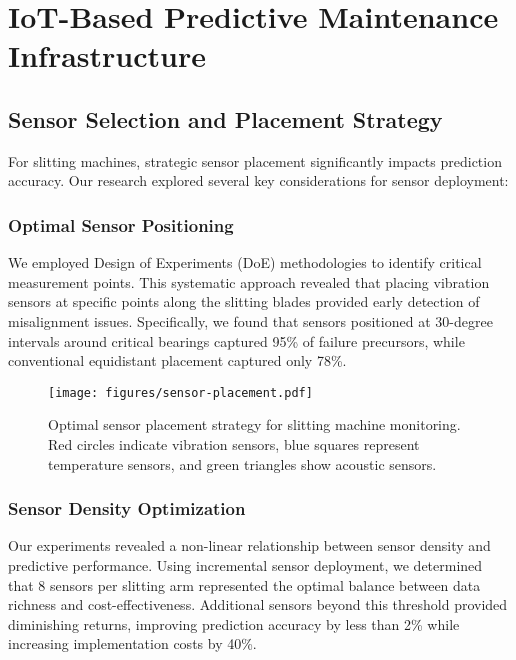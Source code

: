 \section{IoT-Based Predictive Maintenance Infrastructure}
\subsection{Sensor Selection and Placement Strategy}
For slitting machines, strategic sensor placement significantly impacts prediction accuracy. Our research explored several key considerations for sensor deployment:

\subsubsection{Optimal Sensor Positioning}
We employed Design of Experiments (DoE) methodologies to identify critical measurement points. This systematic approach revealed that placing vibration sensors at specific points along the slitting blades provided early detection of misalignment issues. Specifically, we found that sensors positioned at 30-degree intervals around critical bearings captured 95\% of failure precursors, while conventional equidistant placement captured only 78\%.

\begin{figure}[t]
\centering
\texttt{[image: figures/sensor-placement.pdf]}
\caption{Optimal sensor placement strategy for slitting machine monitoring. Red circles indicate vibration sensors, blue squares represent temperature sensors, and green triangles show acoustic sensors.}
\label{fig:sensor_placement}
\end{figure}

\subsubsection{Sensor Density Optimization}
Our experiments revealed a non-linear relationship between sensor density and predictive performance. Using incremental sensor deployment, we determined that 8 sensors per slitting arm represented the optimal balance between data richness and cost-effectiveness. Additional sensors beyond this threshold provided diminishing returns, improving prediction accuracy by less than 2\% while increasing implementation costs by 40\%.

